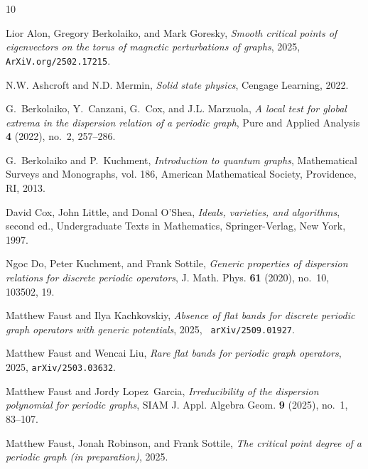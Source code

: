 \documentclass[12pt]{amsart}
\theoremstyle{remark}
\begin{document}
\def\cprime{$'$}

\providecommand{\bysame}{\leavevmode\hbox to3em{\hrulefill}\thinspace}
\providecommand{\MR}{\relax\ifhmode\unskip\space\fi MR }
\providecommand{\MRhref}[2]{%
  \href{http://www.ams.org/mathscinet-getitem?mr=#1}{#2}
}
\providecommand{\href}[2]{#2}
\begin{thebibliography}{10}

Lior Alon, Gregory Berkolaiko, and Mark Goresky, \emph{Smooth critical points
  of eigenvectors on the torus of magnetic perturbations of graphs}, 2025, {\tt
  ArXiV.org/2502.17215}.

N.W. Ashcroft and N.D. Mermin, \emph{Solid state physics}, Cengage Learning,
  2022.

G.~Berkolaiko, Y.~Canzani, G.~Cox, and J.L. Marzuola, \emph{A local test for
  global extrema in the dispersion relation of a periodic graph}, Pure and
  Applied Analysis \textbf{4} (2022), no.~2, 257--286.

G.~Berkolaiko and P.~Kuchment, \emph{Introduction to quantum graphs},
  Mathematical Surveys and Monographs, vol. 186, American Mathematical Society,
  Providence, RI, 2013.

David Cox, John Little, and Donal O'Shea, \emph{Ideals, varieties, and
  algorithms}, second ed., Undergraduate Texts in Mathematics, Springer-Verlag,
  New York, 1997.

Ngoc Do, Peter Kuchment, and Frank Sottile, \emph{Generic properties of
  dispersion relations for discrete periodic operators}, J. Math. Phys.
  \textbf{61} (2020), no.~10, 103502, 19.

Matthew Faust and Ilya Kachkovskiy, \emph{Absence of flat bands for discrete
  periodic graph operators with generic potentials}, 2025, {\tt
  arXiv/2509.01927}.

Matthew Faust and Wencai Liu, \emph{Rare flat bands for periodic graph
  operators}, 2025, {\tt arXiv/2503.03632}.

Matthew Faust and Jordy Lopez~Garcia, \emph{Irreducibility of the dispersion
  polynomial for periodic graphs}, SIAM J. Appl. Algebra Geom. \textbf{9}
  (2025), no.~1, 83--107.

Matthew Faust, Jonah Robinson, and Frank Sottile, \emph{The critical point
  degree of a periodic graph (in preparation)}, 2025.


\end{thebibliography}
\end{document}
